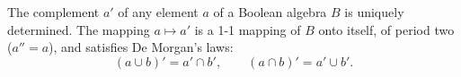 The complement $a'$ of any element $a$ of a Boolean algebra $B$ is uniquely determined. The mapping $a \mapsto a'$ is a 1-1 mapping of $B$ onto itself, of period two ($a'' = a$), and satisfies De Morgan's laws:
$$(a \cup b)' = a' \cap b', \qquad (a \cap b)' = a' \cup b'.$$
